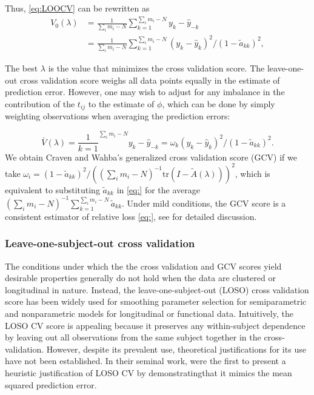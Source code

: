 \documentclass[12pt]{article}
\newcommand{\tildeA}{\tilde{A}}
\theoremstyle{definition}
\begin{document}
Thus, \ref{eq:LOOCV} can be rewritten as 
\begin{align*} 
V_0\left(\lambda\right) &= \frac{1}{{\sum_{i}m_i - N}} \sum_{k = 1}^{\sum_{i}m_i - N}  y_k - \hat{y}_{-k}\\
 &=  \frac{1}{{\sum_{i}m_i - N}} \sum_{k = 1}^{\sum_{i}m_i - N}  \left(y_k - \hat{y}_{k}\right)^2/\left(1-\tilde{a}_{kk}\right)^2 , 
\end{align*}

The best $\lambda$ is the value that minimizes the cross validation score. The leave-one-out cross validation score weighs all data points equally in the estimate of prediction error. However, one may wish to adjust for any imbalance in the contribution of the $t_{ij}$ to the estimate of $\phi$, which can be done by simply weighting observations when averaging the prediction errors:
   
\begin{equation*} 
\bar{V}\left(\lambda\right) = \frac{1}{k = 1}^{\sum_{i}m_i - N}   y_k - \hat{y}_{-k} = \omega_k \left(y_k - \hat{y}_{k}\right)^2/\left(1-\tilde{a}_{kk}\right)^2 . 
\end{equation*}
\noindent
We obtain Craven and Wahba's generalized cross validation score (GCV) if we take $\omega_i = \left(1 - \tilde{a}_{kk}\right)^2/\left(\left(\sum_{i}m_i - N \right)^{-1}\mbox{tr}\left( I - \tildeA\left(\lambda\right)\right)\right)^2$, which is equivalent to substituting $\tilde{a}_{kk}$ in \ref{eq:} for the average $\left(\sum_{i}m_i - N \right)^{-1} \sum_{k=1}^{\sum_{i}m_i - N} \tilde{a}_{kk}$. Under mild conditions, the GCV score is a consistent estimator of relative loss \ref{eq:}, see \citet{craven1978smoothing} for detailed discussion.
  
\subsubsection{Leave-one-subject-out cross validation}  
The conditions under which the the cross validation and GCV scores yield desirable properties generally do not hold when the data are clustered or longitudinal in nature. Instead, the leave-one-subject-out (LOSO) cross validation score has been widely used for smoothing parameter selection for semiparametric and nonparametric models for longitudinal or functional data. Intuitively, the LOSO CV score is appealing because it preserves any within-subject dependence by leaving out all observations from the same subject together in the cross-validation.  However, despite its prevalent use, theoretical justifications for its use have not been established. In their seminal work, \citet{rice1991estimating} were the first to present a heuristic justification of LOSO CV by demonstratingthat it mimics the mean squared prediction error.
 
\end{document}
